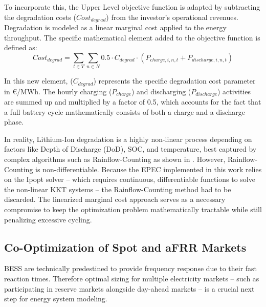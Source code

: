 To incorporate this, the Upper Level objective function is adapted by subtracting the degradation costs (\(Cost_{degrad}\)) from the investor's operational revenues. Degradation is modeled as a linear marginal cost applied to the energy throughput. The specific mathematical element added to the objective function is defined as:
\begin{equation}
    Cost_{degrad} = \sum_{t\in T}\sum_{n\in N} 0.5 \cdot C_{degrad} \cdot (P_{charge, i, n, t} + P_{discharge, i, n, t})
\end{equation}

In this new element, (\(C_{degrad}\)) represents the specific degradation cost parameter in €/MWh. The hourly charging (\(P_{charge}\)) and discharging (\(P_{discharge}\)) activities are summed up and multiplied by a factor of 0.5, which accounts for the fact that a full battery cycle mathematically consists of both a charge and a discharge phase.

In reality, Lithium-Ion degradation is a highly non-linear process depending on factors like Depth of Discharge (DoD), SOC, and temperature, best captured by complex algorithms such as Rainflow-Counting as shown in \cite{shin_optimal_2020}. However, Rainflow-Counting is non-differentiable. Because the EPEC implemented in this work relies on the Ipopt solver -- which requires continuous, differentiable functions to solve the non-linear KKT systems -- the Rainflow-Counting method had to be discarded. The linearized marginal cost approach serves as a necessary compromise to keep the optimization problem mathematically tractable while still penalizing excessive cycling.

\subsection{Co-Optimization of Spot and aFRR Markets} \label{subsect:Co-Optimization}
BESS are technically predestined to provide frequency response due to their fast reaction times. Therefore optimal sizing for multiple electricity markets -- such as participating in reserve markets alongside day-ahead markets -- is a crucial next step for energy system modeling.

